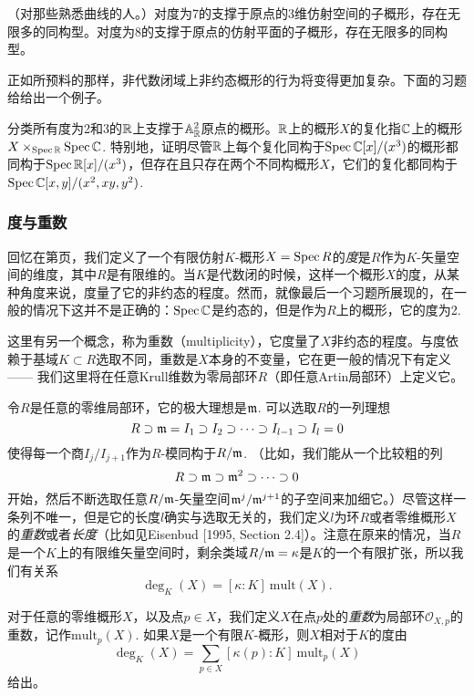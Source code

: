 \begin{exe}
	（对那些熟悉曲线的人。）对度为7的支撑于原点的3维仿射空间的子概形，存在无限多的同构型。对度为8的支撑于原点的仿射平面的子概形，存在无限多的同构型。
\end{exe}

正如所预料的那样，非代数闭域上非约态概形的行为将变得更加复杂。下面的习题给给出一个例子。

\begin{exe}
	分类所有度为2和3的$\mathbb{R}$上支撑于$\mathbb{A}_{\mathbb{R}}^2$原点的概形。$\mathbb{R}$上的概形$X$的复化指$\mathbb{C}$上的概形$X\times_{\operatorname{Spec} \mathbb{R}}\operatorname{Spec} \mathbb{C}$. 特别地，证明尽管$\mathbb{R}$上每个复化同构于$\operatorname{Spec} \mathbb{C}[x]/(x^3)$的概形都同构于$\operatorname{Spec} \mathbb{R}[x]/(x^3)$，但存在且只存在两个不同构概形$X$，它们的复化都同构于$\operatorname{Spec} \mathbb{C}[x,y]/(x^2,xy,y^2)$.
\end{exe}

\subsubsection*{度与重数}

回忆在第\pageref{deg}页，我们定义了一个有限仿射$K$-概形$X=\operatorname{Spec} R$的\textit{度}是$R$作为$K$-矢量空间的维度，其中$R$是有限维的。当$K$是代数闭的时候，这样一个概形$X$的度，从某种角度来说，度量了它的非约态的程度。然而，就像最后一个习题所展现的，在一般的情况下这并不是正确的：$\operatorname{Spec} \mathbb{C}$是约态的，但是作为$R$上的概形，它的度为2.

这里有另一个概念，称为重数（multiplicity），它度量了$X$非约态的程度。与度依赖于基域$K\subset R$选取不同，重数是$X$本身的不变量，它在更一般的情况下有定义 ------ 我们这里将在任意Krull维数为零局部环$R$（即任意Artin局部环）上定义它。

令$R$是任意的零维局部环，它的极大理想是$\mathfrak{m}$. 可以选取$R$的一列理想
\[
	R\supset \mathfrak{m} = I_1\supset I_2\supset \cdots \supset I_{l-1}\supset I_l=0
\]
使得每一个商$I_j/I_{j+1}$作为$R$-模同构于$R/\mathfrak{m}$. （比如，我们能从一个比较粗的列
\[
	R\supset \mathfrak{m} \supset \mathfrak{m}^2\supset \cdots \supset 0
\]
开始，然后不断选取任意$R/\mathfrak{m}$-矢量空间$\mathfrak{m}^j/\mathfrak{m}^{j+1}$的子空间来加细它。）尽管这样一条列不唯一，但是它的长度$l$确实与选取无关的，我们定义$l$为环$R$或者零维概形$X$的\textit{重数}或者\textit{长度}（比如见Eisenbud [1995, Section 2.4]）。注意在原来的情况，当$R$是一个$K$上的有限维矢量空间时，剩余类域$R/\mathfrak{m}=\kappa$是$K$的一个有限扩张，所以我们有关系
\[
	\deg_K(X)=[\kappa:K]~\mathrm{mult}(X).
\]

对于任意的零维概形$X$，以及点$p\in X$，我们定义$X$在点$p$处的\textit{重数}为局部环$\mathscr{O}_{X,p}$的重数，记作$\mathrm{mult}_p(X)$. 如果$X$是一个有限$K$-概形，则$X$相对于$K$的度由
\[
	\deg_K(X)=\sum_{p\in X}[\kappa(p):K]~\mathrm{mult}_p(X)
\]
给出。

